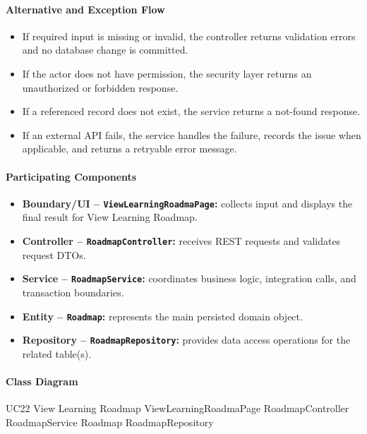 \paragraph{Alternative and Exception Flow}

\begin{itemize}
    \item If required input is missing or invalid, the controller returns validation errors and no database change is committed.
    \item If the actor does not have permission, the security layer returns an unauthorized or forbidden response.
    \item If a referenced record does not exist, the service returns a not-found response.
    \item If an external API fails, the service handles the failure, records the issue when applicable, and returns a retryable error message.
\end{itemize}

\paragraph{Participating Components}

\begin{itemize}
    \item \textbf{Boundary/UI -- \texttt{ViewLearningRoadmaPage}:} collects input and displays the final result for View Learning Roadmap.
    \item \textbf{Controller -- \texttt{RoadmapController}:} receives REST requests and validates request DTOs.
    \item \textbf{Service -- \texttt{RoadmapService}:} coordinates business logic, integration calls, and transaction boundaries.
    \item \textbf{Entity -- \texttt{Roadmap}:} represents the main persisted domain object.
    \item \textbf{Repository -- \texttt{RoadmapRepository}:} provides data access operations for the related table(s).
\end{itemize}

\paragraph{Class Diagram}

\ClassDiagram
{UC22 View Learning Roadmap}
{ViewLearningRoadmaPage}
{RoadmapController}
{RoadmapService}
{Roadmap}
{RoadmapRepository}


